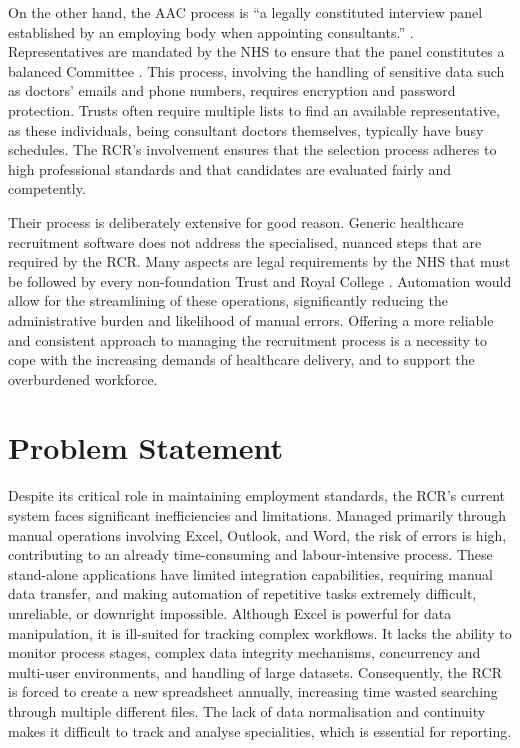 On the other hand, the AAC process is “a legally constituted interview panel established by an employing body when appointing consultants.” \parencite{royal_college_of_surgeons_of_england_advisory_2024}. Representatives are mandated by the NHS to ensure that the panel constitutes a balanced Committee \parencite{national_health_service_appointment_of_consultants_national_2005}. This process, involving the handling of sensitive data such as doctors' emails and phone numbers, requires encryption and password protection. Trusts often require multiple lists to find an available representative, as these individuals, being consultant doctors themselves, typically have busy schedules. The RCR’s involvement ensures that the selection process adheres to high professional standards and that candidates are evaluated fairly and competently.

Their process is deliberately extensive for good reason. Generic healthcare recruitment software does not address the specialised, nuanced steps that are required by the RCR. Many aspects are legal requirements by the NHS that must be followed by every non-foundation Trust and Royal College \parencite{royal_college_of_surgeons_of_england_advisory_2024}. Automation would allow for the streamlining of these operations, significantly reducing the administrative burden and likelihood of manual errors. Offering a more reliable and consistent approach to managing the recruitment process is a necessity to cope with the increasing demands of healthcare delivery, and to support the overburdened workforce.
\section{Problem Statement}
Despite its critical role in maintaining employment standards, the RCR's current system faces significant inefficiencies and limitations. Managed primarily through manual operations involving Excel, Outlook, and Word, the risk of errors is high, contributing to an already time-consuming and labour-intensive process. These stand-alone applications have limited integration capabilities, requiring manual data transfer, and making automation of repetitive tasks extremely difficult, unreliable, or downright impossible. Although Excel is powerful for data manipulation, it is ill-suited for tracking complex workflows. It lacks the ability to monitor process stages, complex data integrity mechanisms, concurrency and multi-user environments, and handling of large datasets. Consequently, the RCR is forced to create a new spreadsheet annually, increasing time wasted searching through multiple different files. The lack of data normalisation and continuity makes it difficult to track and analyse specialities, which is essential for reporting.


